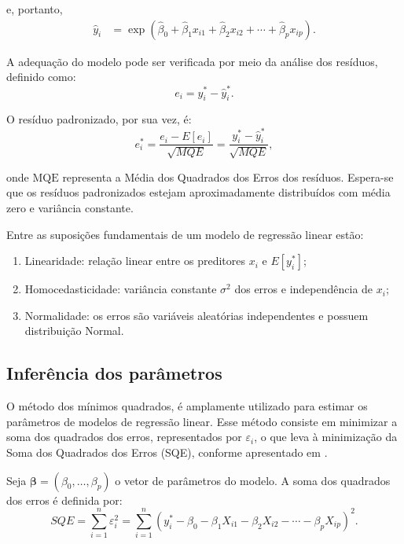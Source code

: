 \documentclass[12pt,a4paper,header]{abnt}
\begin{document}
e, portanto,
\begin{align}
\hat{y}_i &= \exp\left(\hat{\beta}_0 + \hat{\beta}_1 x_{i1} + \hat{\beta}_2 x_{i2} + \cdots + \hat{\beta}_p x_{ip}\right).
\label{eq:exp_pred}
\end{align}

A adequação do modelo pode ser verificada por meio da análise dos resíduos, definido como:
\begin{equation}
e_i = y_i^* - \hat{y}_i^*.
\label{eq:residual}
\end{equation}

O resíduo padronizado, por sua vez, é:
\begin{equation}
e_i^* = \frac{e_i - \textit{E}[e_i]}{\sqrt{\textit{MQE}}} = \frac{y_i^* - \hat{y}_i^*}{\sqrt{\textit{MQE}}} ,
\label{eq:residual_p}
\end{equation}

\noindent onde \(\text{MQE}\) representa a Média dos Quadrados dos Erros dos resíduos. Espera-se que os resíduos padronizados estejam aproximadamente distribuídos com média zero e variância constante.

Entre as suposições fundamentais de um modelo de regressão linear estão:

\begin{enumerate}
    \item Linearidade: relação linear entre os preditores \( \textit{x}_i \) e \( \textit{E}[y_i^*] \);
    \item Homocedasticidade: variância constante \( \sigma^2 \) dos erros e independência de \( \textit{x}_i \);
    \item Normalidade: os erros são variáveis aleatórias independentes e possuem distribuição Normal.
\end{enumerate}


\subsection{Inferência dos parâmetros}
O método dos mínimos quadrados, é amplamente utilizado para estimar os parâmetros de modelos de regressão linear. Esse método consiste em minimizar a soma dos quadrados dos erros, representados por \( \varepsilon_i \), o que leva à minimização da Soma dos Quadrados dos Erros (SQE), conforme apresentado em .

Seja \( \boldsymbol{\beta} = (\beta_0,\ldots,\beta_p)\) o vetor de parâmetros do modelo. A soma dos quadrados dos erros é definida por:
\begin{equation}
    SQE = \sum_{i=1}^{n} \varepsilon_i^2 = \sum_{i=1}^{n} (y_i^* - \beta_0 - \beta_1 X_{i1} - \beta_2 X_{i2} - \cdots - \beta_p X_{ip})^2.
\end{equation}
\end{document}
